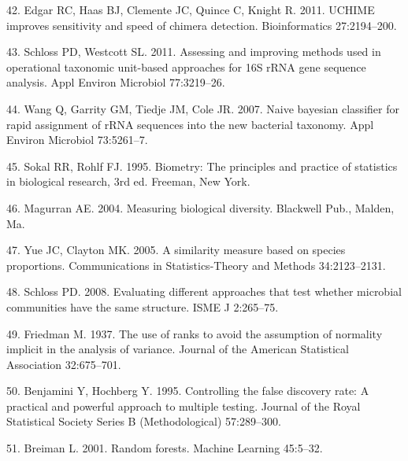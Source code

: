 \documentclass[11pt,]{article}
\begin{document}
\hypertarget{ref-edgar_uchime_2011}{}
42. Edgar RC, Haas BJ, Clemente JC, Quince C, Knight R. 2011. UCHIME
improves sensitivity and speed of chimera detection. Bioinformatics
27:2194--200.

\hypertarget{ref-schloss_OTUanalysis_2011}{}
43. Schloss PD, Westcott SL. 2011. Assessing and improving methods used
in operational taxonomic unit-based approaches for 16S rRNA gene
sequence analysis. Appl Environ Microbiol 77:3219--26.

\hypertarget{ref-wang_taxonomy_2007}{}
44. Wang Q, Garrity GM, Tiedje JM, Cole JR. 2007. Naive bayesian
classifier for rapid assignment of rRNA sequences into the new bacterial
taxonomy. Appl Environ Microbiol 73:5261--7.

\hypertarget{ref-sokal_biometrystats_1995}{}
45. Sokal RR, Rohlf FJ. 1995. Biometry: The principles and practice of
statistics in biological research, 3rd ed. Freeman, New York.

\hypertarget{ref-magurran_measuring_2004}{}
46. Magurran AE. 2004. Measuring biological diversity. Blackwell Pub.,
Malden, Ma.

\hypertarget{ref-yue_thetaYC_2005}{}
47. Yue JC, Clayton MK. 2005. A similarity measure based on species
proportions. Communications in Statistics-Theory and Methods
34:2123--2131.

\hypertarget{ref-schloss_commstruct_2008}{}
48. Schloss PD. 2008. Evaluating different approaches that test whether
microbial communities have the same structure. ISME J 2:265--75.

\hypertarget{ref-friedman_1937}{}
49. Friedman M. 1937. The use of ranks to avoid the assumption of
normality implicit in the analysis of variance. Journal of the American
Statistical Association 32:675--701.

\hypertarget{ref-Benjamini_Hochberg_1995}{}
50. Benjamini Y, Hochberg Y. 1995. Controlling the false discovery rate:
A practical and powerful approach to multiple testing. Journal of the
Royal Statistical Society Series B (Methodological) 57:289--300.

\hypertarget{ref-breiman_rf_2001}{}
51. Breiman L. 2001. Random forests. Machine Learning 45:5--32.
\end{document}
